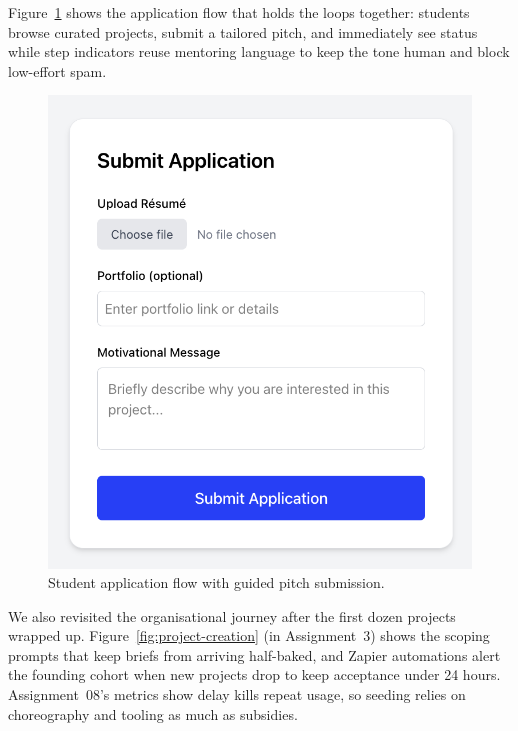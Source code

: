 Figure~\ref{fig:application-flow} shows the application flow that holds the loops together: students browse curated projects, submit a tailored pitch, and immediately see status while step indicators reuse mentoring language to keep the tone human and block low-effort spam.

\begin{figure}[H]
  \centering
  \includegraphics[width=0.85\linewidth]{figures/Student-Submission.png}
  \caption{Student application flow with guided pitch submission.}
  \label{fig:application-flow}
\end{figure}

We also revisited the organisational journey after the first dozen projects wrapped up. Figure~\ref{fig:project-creation} (in Assignment~3) shows the scoping prompts that keep briefs from arriving half-baked, and Zapier automations alert the founding cohort when new projects drop to keep acceptance under 24 hours. Assignment~08's metrics show delay kills repeat usage, so seeding relies on choreography and tooling as much as subsidies.
